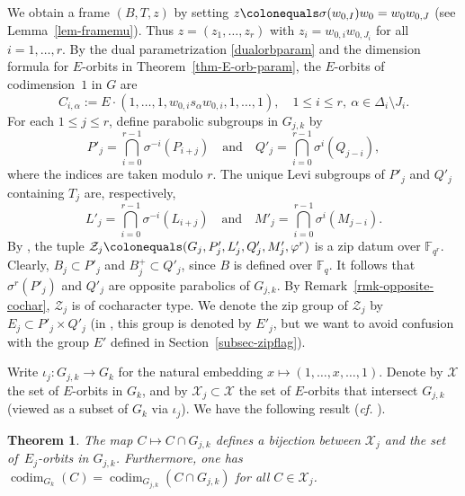 \documentclass[11pt]{amsart}
\numberwithin{equation}{section}
\newtheorem{theorem}{Theorem}[section]
\theoremstyle{definition}
\theoremstyle{remark}
\newcommand{\Xcal}{{\mathcal X}}
\newcommand{\Zcal}{{\mathcal Z}}
\newcommand{\FF}{\mathbb{F}}
\DeclareMathOperator{\codim}{codim}
\begin{document}
We obtain a frame $(B,T,z)$ by setting $z\colonequals \sigma(w_{0,I}) w_0=w_0 w_{0,J}$ (see Lemma~\ref{lem-framemu}). Thus $z=(z_1,\dots ,z_r)$ with $z_i=w_{0,i} w_{0,J_i}$ for all $i=1,\dots ,r$. By the dual parametrization \eqref{dualorbparam} 
and the dimension formula for $E$-orbits in Theorem~\ref{thm-E-orb-param}, 
the $E$-orbits of codimension~$1$ in $G$ are
\begin{equation} \label{codim1-Weil}
C_{i,\alpha}:=E\cdot\left(1,\dots,1,w_{0,i} s_{\alpha} w_{0,i},1,\dots,1\right), \quad 1\leq i \leq r, \ \alpha \in \Delta_i \setminus J_i.
\end{equation}
For each $1\leq j \leq r$, define parabolic subgroups in $G_{j,k}$ by
\[
P'_{j}=\bigcap_{i=0}^{r-1}\sigma^{-i}(P_{i+j}) \quad\mbox{and}\quad Q'_{j}= \bigcap_{i=0}^{r-1}\sigma^{i}(Q_{j-i}), 
\]
where the indices are taken modulo $r$. The unique Levi subgroups of $P'_j$ and $Q'_j$ containing $T_j$ are, respectively, 
\[
L'_{j}=\bigcap_{i=0}^{r-1}\sigma^{-i}(L_{i+j}) \quad\mbox{and}\quad M'_{j}= \bigcap_{i=0}^{r-1}\sigma^{i}(M_{j-i}). 
\]
By \cite[Lemma 4.2.1]{Koskivirta-Wedhorn-Hasse}, the tuple $\Zcal_j \colonequals (G_j,P'_j,L'_j,Q'_j,M'_j,\varphi^r)$ is a zip datum over $\FF_{q^r}$. Clearly, $B_j\subset P'_j$ and $B_j^+ \subset Q'_j$, since $B$ is defined over $\FF_{q}$. It follows that $\sigma^r(P'_j)$ and $Q'_j$ are opposite parabolics of $G_{j,k}$. By Remark~\ref{rmk-opposite-cochar}, $\Zcal_j$ is of cocharacter type. We denote the zip group of $\Zcal_j$ by $E_j\subset P'_j \times Q'_j$ (in \cite{Koskivirta-Wedhorn-Hasse}, this group is denoted by $E'_j$, but we want to avoid confusion with the group $E'$ defined in Section~\ref{subsec-zipflag}).

Write $\iota_j\colon G_{j,k}\to G_k$ for the natural embedding $x\mapsto (1, \ldots , x, \ldots ,1)$. Denote by $\Xcal$ the set of $E$-orbits in $G_k$, and by $\Xcal_j\subset \Xcal$ the set of $E$-orbits that intersect $G_{j,k}$ (viewed as a subset of $G_k$ via $\iota_j$). We have the following result (\textit{cf.} \cite[Theorem 4.3.1]{Koskivirta-Wedhorn-Hasse}).

\begin{theorem}
\label{bijorbits}The map $C\mapsto C\cap G_{j,k}$ defines a
bijection between $\Xcal_{j}$ and the set of\, $E_{j}$-orbits in $G_{j,k}$. Furthermore,  one has $\codim_{G_k}(C) = \codim_{G_{j,k}}(C\cap G_{j,k})$ for all $C\in \Xcal_j$.
\end{theorem}
\end{document}
